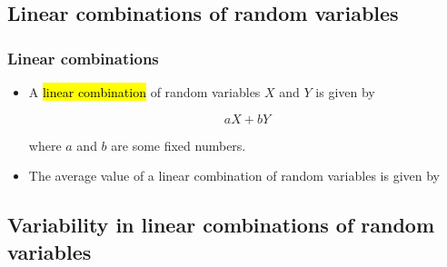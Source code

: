 \documentclass[slidestop,compress,mathserif]{beamer}
\newcommand{\soln}[1]{\textit{#1}}
\begin{document}
\subsection{Linear combinations of random variables}


\begin{frame}
\frametitle{Linear combinations}

\begin{itemize}

\item A \hl{linear combination} of random variables $X$ and $Y$ is given by

\[ aX + bY \]

where $a$ and $b$ are some fixed numbers.

\pause

\item The average value of a linear combination of random variables is given by
\formula{\[ E(aX + bY) = a \times E(X) + b \times E(Y) \]}

\end{itemize}

\end{frame}







\subsection{Variability in linear combinations of random variables}
\end{document}

